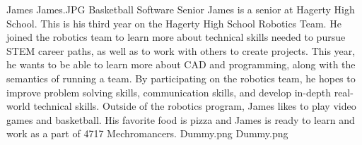 \insertbio
{James}
{James.JPG}
{Basketball}
{Software}
{Senior}
{
James is a senior at Hagerty High School. This is his third year on the Hagerty High School Robotics Team. He joined the robotics team to learn more about technical skills needed to pursue STEM career paths, as well as to work with others to create projects. This year, he wants to be able to learn more about CAD and programming, along with the semantics of running a team. By participating on the robotics team, he hopes to improve problem solving skills, communication skills, and develop in-depth real-world technical skills. Outside of the robotics program, James likes to play video games and basketball. His favorite food is pizza and James is ready to learn and work as a part of 4717 Mechromancers.
}
{Dummy.png}
{Dummy.png}
